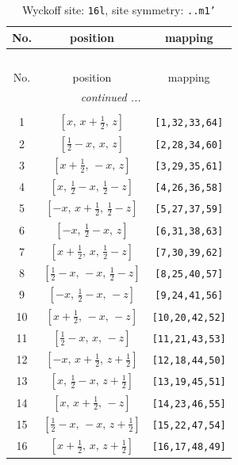 \documentclass[fleqn,8pt]{jsarticle}
\begin{document}
\renewcommand{\arraystretch}{1.2}
\begin{longtable}{ccc}
\caption{Wyckoff site: {\tt 16l}, site symmetry: {\tt ..m1'}}
 \\
 \hline \hline
No. & position & mapping \\ \hline \endfirsthead

\multicolumn{2}{l}{\tablename\ \thetable{}} \\
 \hline \hline
No. & position & mapping \\ \hline \endhead

 \hline \hline
\multicolumn{2}{r}{\footnotesize\it continued ...} \\ \endfoot

 \hline \hline
\multicolumn{2}{r}{} \\ \endlastfoot

1 & $\left[ x,\, x + \frac{1}{2},\, z \right]$ & {\tt [1,32,33,64]} \\ \hline
2 & $\left[ \frac{1}{2} - x,\, x,\, z \right]$ & {\tt [2,28,34,60]} \\ \hline
3 & $\left[ x + \frac{1}{2},\, - x,\, z \right]$ & {\tt [3,29,35,61]} \\ \hline
4 & $\left[ x,\, \frac{1}{2} - x,\, \frac{1}{2} - z \right]$ & {\tt [4,26,36,58]} \\ \hline
5 & $\left[ - x,\, x + \frac{1}{2},\, \frac{1}{2} - z \right]$ & {\tt [5,27,37,59]} \\ \hline
6 & $\left[ - x,\, \frac{1}{2} - x,\, z \right]$ & {\tt [6,31,38,63]} \\ \hline
7 & $\left[ x + \frac{1}{2},\, x,\, \frac{1}{2} - z \right]$ & {\tt [7,30,39,62]} \\ \hline
8 & $\left[ \frac{1}{2} - x,\, - x,\, \frac{1}{2} - z \right]$ & {\tt [8,25,40,57]} \\ \hline
9 & $\left[ - x,\, \frac{1}{2} - x,\, - z \right]$ & {\tt [9,24,41,56]} \\ \hline
10 & $\left[ x + \frac{1}{2},\, - x,\, - z \right]$ & {\tt [10,20,42,52]} \\ \hline
11 & $\left[ \frac{1}{2} - x,\, x,\, - z \right]$ & {\tt [11,21,43,53]} \\ \hline
12 & $\left[ - x,\, x + \frac{1}{2},\, z + \frac{1}{2} \right]$ & {\tt [12,18,44,50]} \\ \hline
13 & $\left[ x,\, \frac{1}{2} - x,\, z + \frac{1}{2} \right]$ & {\tt [13,19,45,51]} \\ \hline
14 & $\left[ x,\, x + \frac{1}{2},\, - z \right]$ & {\tt [14,23,46,55]} \\ \hline
15 & $\left[ \frac{1}{2} - x,\, - x,\, z + \frac{1}{2} \right]$ & {\tt [15,22,47,54]} \\ \hline
16 & $\left[ x + \frac{1}{2},\, x,\, z + \frac{1}{2} \right]$ & {\tt [16,17,48,49]} \\
\end{longtable}
\end{document}
